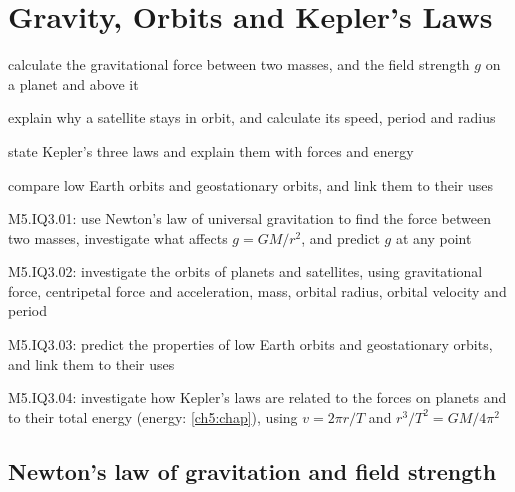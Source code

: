 \chapter{Gravity, Orbits and Kepler's Laws}\label{ch4:chap}


\begin{goals}
  \item calculate the gravitational force between two masses, and the field strength $g$ on a
        planet and above it
  \item explain why a satellite stays in orbit, and calculate its speed, period and radius
  \item state Kepler's three laws and explain them with forces and energy
  \item compare low Earth orbits and geostationary orbits, and link them to their uses
\end{goals}

\begin{syllabus}
  \item M5.IQ3.01: use Newton's law of universal gravitation to find the force between two
        masses, investigate what affects $g = GM/r^2$, and predict $g$ at any point
  \item M5.IQ3.02: investigate the orbits of planets and satellites, using gravitational force,
        centripetal force and acceleration, mass, orbital radius, orbital velocity and period
  \item M5.IQ3.03: predict the properties of low Earth orbits and geostationary orbits, and link
        them to their uses
  \item M5.IQ3.04: investigate how Kepler's laws are related to the forces on planets and to
        their total energy (energy: \cref{ch5:chap}), using $v = 2\pi r/T$ and
        $r^3/T^2 = GM/4\pi^2$
\end{syllabus}

\section{Newton's law of gravitation and field strength}\label{ch4:sec:newton}

